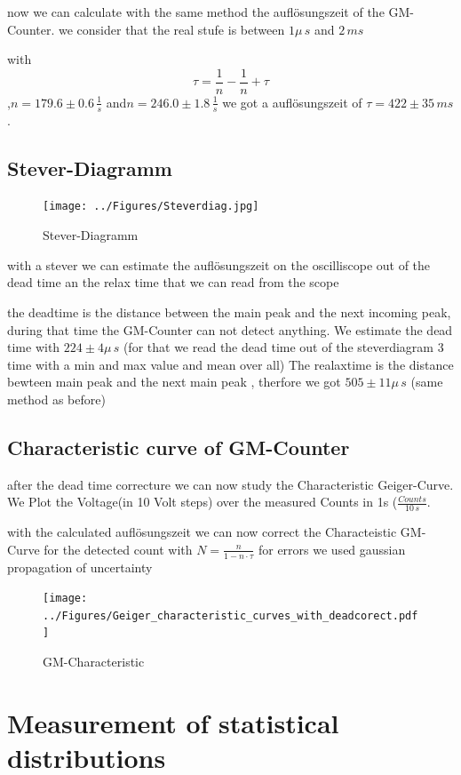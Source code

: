 now we can calculate with the same method the auflösungszeit of the GM-Counter.
we consider that the real stufe is between $1\mu\,s$ and $2\,ms$ 

with 
\begin{equation}
\tau =\frac{1}{n}-\frac{1}{n}+\tau
\end{equation}
 ,$n=179.6\pm0.6\,\frac{1}{s}$ and$n=246.0\pm1.8\,\frac{1}{s}$ we got a auflösungszeit of $\tau=422\pm35\,ms $
.
\subsection{Stever-Diagramm}

\begin{figure}[H]
\centering
\texttt{[image: ../Figures/Steverdiag.jpg]}
\caption{Stever-Diagramm}
\label{fig:Stever-Diagramm}
\end{figure}
with a stever we  can estimate the auflösungszeit on the oscilliscope out of the dead time an the relax time that we can read from the scope 

the deadtime is the distance between the main peak and the next incoming peak, during that time the GM-Counter can not detect anything.
 We estimate the dead time with $224\pm4\mu\,s$ (for that we read the dead time out of the steverdiagram 3 time with a min and max value and mean over all)
 The realaxtime is the distance bewteen main peak and the next main peak , therfore we got  $505\pm11\mu\,s$ (same method as before)  
 
\subsection{Characteristic curve of GM-Counter}
after the dead time correcture we can now study the Characteristic Geiger-Curve.
We Plot the Voltage(in 10 Volt steps) over the measured Counts in 1s ($\frac{Counts}{10\,s}$.

with the calculated auflösungszeit we can now correct the Characteistic GM-Curve for the detected count with $N =\frac{n}{1-n\cdot\tau}$ 
for errors we used gaussian propagation of uncertainty 


\begin{figure}[H]
\centering
\texttt{[image: ../Figures/Geiger\_characteristic\_curves\_with\_deadcorect.pdf]}
\caption{GM-Characteristic}
\label{fig:GM-Characteristic}
\end{figure}



\section{Measurement of statistical distributions}

